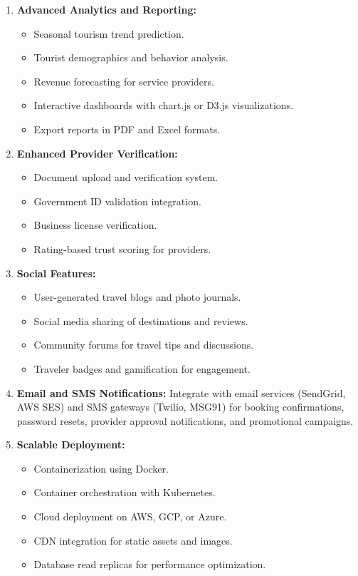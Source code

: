 \begin{enumerate}[leftmargin=2em]
    \item \textbf{Advanced Analytics and Reporting:}
    \begin{itemize}
        \item Seasonal tourism trend prediction.
        \item Tourist demographics and behavior analysis.
        \item Revenue forecasting for service providers.
        \item Interactive dashboards with chart.js or D3.js visualizations.
        \item Export reports in PDF and Excel formats.
    \end{itemize}

    \item \textbf{Enhanced Provider Verification:}
    \begin{itemize}
        \item Document upload and verification system.
        \item Government ID validation integration.
        \item Business license verification.
        \item Rating-based trust scoring for providers.
    \end{itemize}

    \item \textbf{Social Features:}
    \begin{itemize}
        \item User-generated travel blogs and photo journals.
        \item Social media sharing of destinations and reviews.
        \item Community forums for travel tips and discussions.
        \item Traveler badges and gamification for engagement.
    \end{itemize}

    \item \textbf{Email and SMS Notifications:} Integrate with email services (SendGrid, AWS SES) and SMS gateways (Twilio, MSG91) for booking confirmations, password resets, provider approval notifications, and promotional campaigns.

    \item \textbf{Scalable Deployment:}
    \begin{itemize}
        \item Containerization using Docker.
        \item Container orchestration with Kubernetes.
        \item Cloud deployment on AWS, GCP, or Azure.
        \item CDN integration for static assets and images.
        \item Database read replicas for performance optimization.
    \end{itemize}


\end{enumerate}
